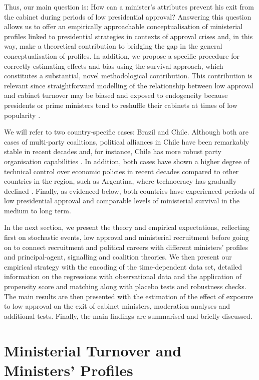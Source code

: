 \documentclass[12pt,halfline,a4paper]{ouparticle}
\begin{document}
Thus, our main question is: How can a minister’s attributes prevent his exit from the cabinet during periods of low presidential approval? Answering this question allows us to offer an empirically approachable conceptualisation of ministerial profiles linked to presidential strategies in contexts of approval crises and, in this way, make a theoretical contribution to bridging the gap in the general conceptualisation of profiles. In addition, we propose a specific procedure for correctly estimating effects and bias using the survival approach, which constitutes a substantial, novel methodological contribution. This contribution is relevant since straightforward modelling of the relationship between low approval and cabinet turnover may be biased and exposed to endogeneity because presidents or prime ministers tend to reshuffle their cabinets at times of low popularity \citep{Kam2005, MartinezGallardo2014}.

We will refer to two country-specific cases: Brazil and Chile. Although both are cases of multi-party coalitions, political alliances in Chile have been remarkably stable in recent decades and, for instance, Chile has more robust party organisation capabilities \citep{Martinez2021}. In addition, both cases have shown a higher degree of technical control over economic policies in recent decades compared to other countries in the region, such as Argentina, where technocracy has gradually declined \citep{Dargent2015}. Finally, as evidenced below, both countries have experienced periods of low presidential approval and comparable levels of ministerial survival in the medium to long term.

In the next section, we present the theory and empirical expectations, reflecting first on stochastic events, low approval and ministerial recruitment before going on to connect recruitment and political careers with different ministers’ profiles and principal-agent, signalling and coalition theories. We then present our empirical strategy with the encoding of the time-dependent data set, detailed information on the regressions with observational data and the application of propensity score and matching along with placebo tests and robustness checks. The main results are then presented with the estimation of the effect of exposure to low approval on the exit of cabinet ministers, moderation analyses and additional tests. Finally, the main findings are summarised and briefly discussed.

\section{Ministerial Turnover and Ministers’ Profiles}
\label{sec2}
\end{document}

